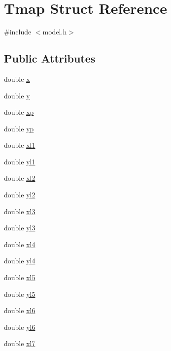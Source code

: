 \hypertarget{struct_tmap}{}\section{Tmap Struct Reference}
\label{struct_tmap}


{\ttfamily \#include $<$model.\+h$>$}

\subsection*{Public Attributes}
\begin{DoxyCompactItemize}
\item 
double \hyperlink{struct_tmap_a20053fbc7a23824b9e4618e239eeaf59}{x}
\item 
double \hyperlink{struct_tmap_a657574a2f2de5ea819f5f4d4049b5c4b}{y}
\item 
double \hyperlink{struct_tmap_a068dfd65c2ecb6af3ddeaf8b7c99bc17}{xp}
\item 
double \hyperlink{struct_tmap_a060ab599d7d4310c5df62d84fcb8479a}{yp}
\item 
double \hyperlink{struct_tmap_a8cb2605c214c040af271abc9dd4491c8}{xl1}
\item 
double \hyperlink{struct_tmap_a716530ae2e5b378e885356c63863c1a8}{yl1}
\item 
double \hyperlink{struct_tmap_abe88e54a6d09a018f04103ae7c196c38}{xl2}
\item 
double \hyperlink{struct_tmap_a00fb94a61d709715d5c3a9a2361dc18c}{yl2}
\item 
double \hyperlink{struct_tmap_a529714b4d9249f784aaf6642aafb46a4}{xl3}
\item 
double \hyperlink{struct_tmap_a1f1766f9a2217c2534c8b92424031709}{yl3}
\item 
double \hyperlink{struct_tmap_a09013aade575f19b3b38311173b1c41a}{xl4}
\item 
double \hyperlink{struct_tmap_addd9c765b017673e9e8cf9e89aa26ea9}{yl4}
\item 
double \hyperlink{struct_tmap_a76c3ef3089548434cac2bbee88493052}{xl5}
\item 
double \hyperlink{struct_tmap_a5bfaab14277cf57ec83b0074ecf16d66}{yl5}
\item 
double \hyperlink{struct_tmap_a58ce8aef068978fa7b1931576ad551fe}{xl6}
\item 
double \hyperlink{struct_tmap_aa86d5aff6f75d2077f5e19b7bef67e08}{yl6}
\item 
double \hyperlink{struct_tmap_aaf9bee3609564a5fa70263f96c3fa5c3}{xl7}

\end{DoxyCompactItemize}
